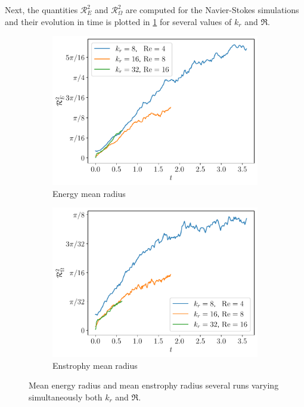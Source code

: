 \documentclass[../main.tex]{subfiles}
\begin{document}
Next, the quantities $\mathcal{R}_E^2$ and $\mathcal{R}_\Omega^2$ are computed for the Navier-Stokes simulations and their evolution in time is plotted in \cref{fig:energy_enstrophy_mean} for several values of $k_r$ and $\Re$.
\begin{figure}[ht]
	\centering
	\begin{subfigure}{0.44\textwidth}
		\centering
		\includegraphics[width=\textwidth]{images/EnergyMeanRadius.pdf}
		\caption{Energy mean radius}
	\end{subfigure}\hspace{0.04\textwidth}
	\begin{subfigure}{0.44\textwidth}
		\centering
		\includegraphics[width=\textwidth]{images/EnstrophyMeanRadius.pdf}
		\caption{Enstrophy mean radius}
	\end{subfigure}
	\caption{Mean energy radius and mean enstrophy radius several runs varying simultaneously both $k_r$ and $\Re$.}\label{fig:energy_enstrophy_mean}
\end{figure}
\end{document}
